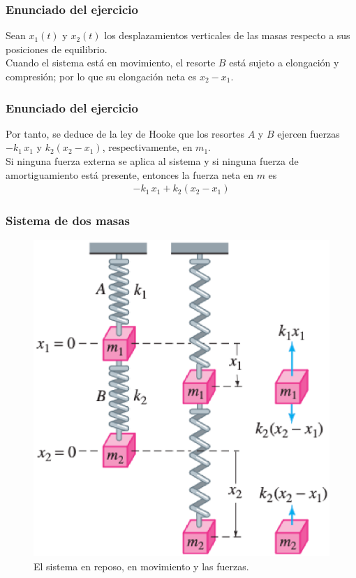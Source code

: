 \begin{frame}
\frametitle{Enunciado del ejercicio}
Sean $x_{1}(t)$ y $x_{2}(t)$ los desplazamientos verticales de las masas respecto a sus posiciones de equilibrio.
\\
\bigskip
\pause
Cuando el sistema está en movimiento, el resorte $B$ está sujeto a elongación y compresión;
por lo que su elongación neta es $x_{2} - x_{1}$.
\end{frame}
\begin{frame}
\frametitle{Enunciado del ejercicio}
Por tanto, se deduce de la ley de Hooke que los resortes $A$ y $B$ ejercen fuerzas $-k_{1} \, x_{1}$ y $k_{2} (x_{2} - x_{1})$, respectivamente, en $m_{1}$.
\\
\bigskip
\pause
Si ninguna fuerza externa se aplica al sistema y si ninguna fuerza de amortiguamiento está
presente, entonces la fuerza neta en $m$ es
\begin{align*}
-k_{1} \, x_{1} + k_{2} (x_{2} - x_{1})
\end{align*}
\end{frame}
\begin{frame}
\frametitle{Sistema de dos masas}
\begin{figure}
    \centering
    \includegraphics[scale=0.35]{Imagenes/Ejercicio_Dos_Masas_02.eps}
    \caption{El sistema en reposo, en movimiento y las fuerzas.}
    \label{fig:figura_dos_masas_02}
\end{figure}
\end{frame}
